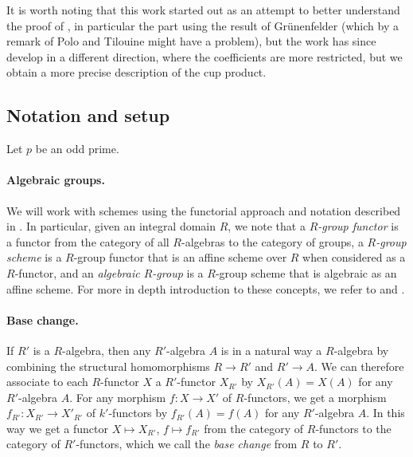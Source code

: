 It is worth noting that this work started out as an attempt to better understand the proof of \cite[Theorem~7.1]{GK}, in particular the part using the result of Grünenfelder (which by a remark of Polo and Tilouine might have a problem), but the work has since develop in a different direction, where the coefficients are more restricted, but we obtain a more precise description of the cup product.

\subsection{Notation and setup}

Let $p$ be an odd prime.

\paragraph{Algebraic groups.} We will work with schemes using the functorial approach and notation described in \cite{Jan}. In particular, given an integral domain $R$, we note that a \emph{$R$-group functor} is a functor from the category of all $R$-algebras to the category of groups, a \emph{$R$-group scheme} is a $R$-group functor that is an affine scheme over $R$ when considered as a $R$-functor, and an \emph{algebraic $R$-group} is a $R$-group scheme that is algebraic as an affine scheme. For more in depth introduction to these concepts, we refer to \cite{Con-book} and \cite{Jan}.

\paragraph{Base change.} If $R'$ is a $R$-algebra, then any $R'$-algebra $A$ is in a natural way a $R$-algebra by combining the structural homomorphisms $R \to R'$ and $R' \to A$. We can therefore associate to each $R$-functor $X$ a $R'$-functor $X_{R'}$ by $X_{R'}(A) = X(A)$ for any $R'$-algebra $A$. For any morphism $f \colon X \to X'$ of $R$-functors, we get a morphism $f_{R'} \colon X_{R'} \to X'_{R'}$ of $k'$-functors by $f_{R'}(A) = f(A)$ for any $R'$-algebra $A$. In this way we get a functor $X \mapsto X_{R'}$, $f \mapsto f_{R'}$ from the category of $R$-functors to the category of $R'$-functors, which we call the \emph{base change} from $R$ to $R'$.

